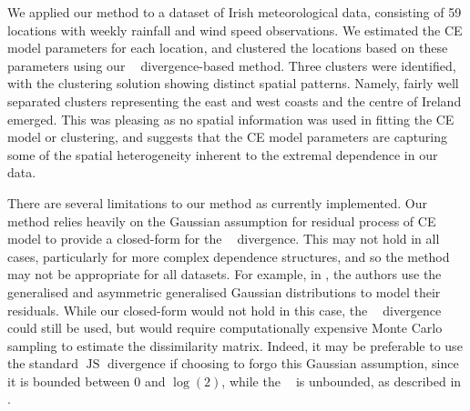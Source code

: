 \documentclass[12pt]{article}
\DeclareMathOperator{\JS}{\mathrm{JS}}
\newcommand{\JSGa}{\mathop{\mathrm{JS}^{\mathrm{G}_{\lambda}}}\nolimits}
\begin{document}
We applied our method to a dataset of Irish meteorological data, consisting of 59 locations with weekly rainfall and wind speed observations.
We estimated the CE model parameters for each location, and clustered the locations based on these parameters using our $\JSGa{}$ divergence-based method. 
Three clusters were identified, with the clustering solution showing distinct spatial patterns.
Namely, fairly well separated clusters representing the east and west coasts and the centre of Ireland emerged.
This was pleasing as no spatial information was used in fitting the CE model or clustering, and suggests that the CE model parameters are capturing some of the spatial heterogeneity inherent to the extremal dependence in our data. 

There are several limitations to our method as currently implemented.
Our method relies heavily on the Gaussian assumption for residual process of CE model to provide a closed-form for the $\JSGa{}$ divergence.
This may not hold in all cases, particularly for more complex dependence structures, and so the method may not be appropriate for all datasets.
For example, in \citet{Farrell2025}, the authors use the generalised and asymmetric generalised Gaussian distributions to model their residuals. 
While our closed-form would not hold in this case, the $\JSGa{}$ divergence could still be used, but would require computationally expensive Monte Carlo sampling to estimate the dissimilarity matrix.
Indeed, it may be preferable to use the standard $\JS{}$ divergence if choosing to forgo this Gaussian assumption, since it is bounded between 0 and $\log{(2)}$, while the $\JSGa{}$ is unbounded, as described in \citet{Thiagarajan2025}.

\end{document}
